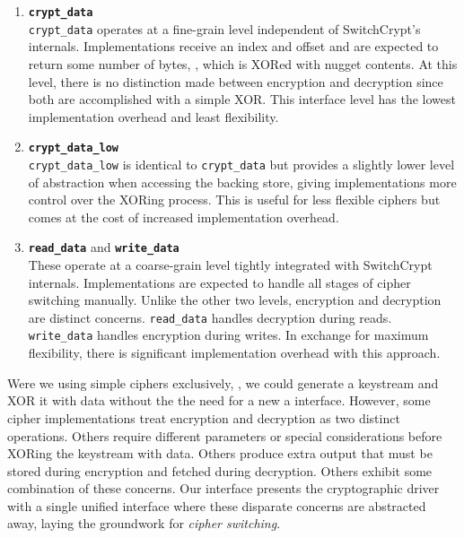 \begin{enumerate}
   \item \textbf{\texttt{crypt\_data}}\\\texttt{crypt\_data} operates at a
   fine-grain level independent of SwitchCrypt's internals. Implementations
   receive an index and offset and are expected to return some number of bytes,
   , which is XORed with nugget contents. At this level, there
   is no distinction made between encryption and decryption since both are
   accomplished with a simple XOR. This interface level has the lowest
   implementation overhead and least flexibility.

   \item \textbf{\texttt{crypt\_data\_low}}\\\texttt{crypt\_data\_low}
   is identical to \texttt{crypt\_data} but provides a slightly lower level of
   abstraction when accessing the backing store, giving implementations more
   control over the XORing process. This is useful for less flexible ciphers but
   comes at the cost of increased implementation overhead.

   \item \textbf{\texttt{read\_data}} and \textbf{\texttt{write\_data}}\\
   These operate at a coarse-grain level tightly integrated with SwitchCrypt
   internals. Implementations are expected to handle all stages of cipher
   switching manually. Unlike the other two levels, encryption and decryption
   are distinct concerns. \texttt{read\_data} handles decryption during reads.
   \texttt{write\_data} handles encryption during writes. In exchange for
   maximum flexibility, there is significant implementation overhead with this
   approach.
\end{enumerate}

Were we using simple ciphers exclusively, , we could generate a keystream and XOR it with data without the
the need for a new a interface. However, some cipher implementations treat
encryption and decryption as two distinct operations. Others require different
parameters or special considerations before XORing the keystream with data.
Others produce extra output that must be stored during encryption and fetched
during decryption. Others exhibit some combination of these concerns. Our
interface presents the cryptographic driver with a single unified interface
where these disparate concerns are abstracted away, laying the groundwork for
\emph{cipher switching}.

